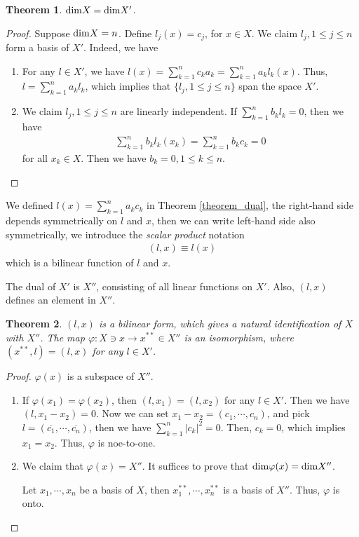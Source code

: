 \documentclass[11pt]{book}
\newtheorem{theorem}{Theorem}[section]
\theoremstyle{definition}
\numberwithin{equation}{chapter}
\begin{document}
\begin{theorem}
${\rm dim}X = {\rm dim}X'$.
\end{theorem}
\begin{proof}
Suppose ${\rm dim}X = n$. Define $l_j(x) = c_j$, for $x\in X$. We claim $l_j, 1\leq j\leq n$ form a basis of $X'$. Indeed, we have
\begin{enumerate}[label=(\alph*)]
    \item For any $l\in X'$, we have $l(x) = \sum^n_{k=1}c_k a_k = \sum^n_{k=1}a_k l_k(x)$. Thus, $l = \sum^n_{k=1}a_k l_k$, which implies that $\{l_j, 1\leq j\leq n\}$ span the space $X'$.
    \item We claim $l_j, 1\leq j\leq n$ are linearly independent. If $\sum^n_{k=1}b_k l_k = 0$, then we have 
    \begin{align*}
        \sum^n_{k=1}b_k l_k(x_k) = \sum^n_{k=1}b_k c_k = 0
    \end{align*}
    for all $x_k\in X$. Then we have $b_k = 0, 1\leq k \leq n$.
\end{enumerate}
\end{proof}

\medskip

We defined $l(x) = \sum^n_{k=1} a_k c_k$ in Theorem \ref{theorem_dual}, the right-hand side depends symmetrically on $l$ and $x$, then we can write left-hand side also symmetrically, we introduce the \emph{scalar product} notation
\begin{align*}
    (l,x) \equiv l(x)
\end{align*}
which is a bilinear function of $l$ and $x$. 

The dual of $X'$ is $X''$, consisting of all linear functions on $X'$. Also, $(l,x)$ defines an element in $X''$.

\begin{theorem}\label{dual_identification_theorem}
$(l,x)$ is a bilinear form, which gives a natural identification of $X$ with $X''$. The map $\varphi:X\ni x \to x^{**}\in X''$ is an isomorphism, where $(x^{**},l) = (l,x)$ for any $l\in X'$.
\end{theorem}
\begin{proof}
$\varphi(x)$ is a subspace of $X''$.
\begin{enumerate}[label=(\alph*)]
    \item If $\varphi(x_1) = \varphi(x_2)$, then $(l,x_1) = (l,x_2)$ for any $l\in X'$. Then we have $(l,x_1 - x_2) = 0$. Now we can set $x_1 - x_2 = (c_1,\cdots,c_n)$, and pick $l = (\overline{c_1},\cdots,\overline{c_n})$, then we have $\sum^n_{k=1}|c_k|^2 = 0$. Then, $c_k = 0$, which implies $x_1 = x_2$. Thus, $\varphi$ is noe-to-one.
    \item We claim that $\varphi(x) = X''$. It suffices to prove that ${\rm dim}\varphi(x) = {\rm dim}X''$.
    
    Let $x_1,\cdots,x_n$ be a basis of $X$, then $x_1^{**},\cdots,x_n^{**}$ is a basis of $X''$. Thus, $\varphi$ is onto.
\end{enumerate}
\end{proof}
\end{document}
